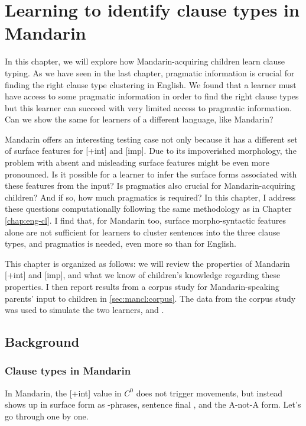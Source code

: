 \chapter{Learning to identify clause types in Mandarin}
\label{chap:man-cl}

In this chapter, we will explore how Mandarin-acquiring children learn clause typing. As we have seen in the last chapter, pragmatic information is crucial for finding the right clause type clustering in English. We found that a learner must have access to some pragmatic information in order to find the right clause types but this learner can succeed with very limited access to pragmatic information. Can we show the same for learners of a different language, like Mandarin?

Mandarin offers an interesting testing case not only because it has a different set of surface features for [+int] and [imp]. Due to its impoverished morphology, the problem with absent and misleading surface features might be even more pronounced. Is it possible for a learner to infer the surface forms associated with these features from the input? Is pragmatics also crucial for Mandarin-acquiring children? And if so, how much pragmatics is required? In this chapter, I address these questions computationally following the same methodology as in Chapter \ref{chap:eng-cl}. I find that, for Mandarin too, surface morpho-syntactic features alone are not sufficient for learners to cluster sentences into the three clause types, and pragmatics is needed, even more so than for English. 

This chapter is organized as follows: we will review the properties of Mandarin [+int] and [imp], and what we know of children's knowledge regarding these properties. I then report results from a corpus study for Mandarin-speaking parents' input to children in  \ref{sec:mancl:corpus}. The data from the corpus study was used to simulate the two learners, \distlearner{} and \praglearner{}.  %

\section{Background}
\label{sec:mancl:bg}
\subsection{Clause types in Mandarin}
\label{sec:mancl:bg:theory}



In Mandarin, the [+int] value in $C^{0}$ does not trigger movements, but instead shows up in surface form as \twh-phrases, sentence final , and the A-not-A form. Let's go through one by one.
 
